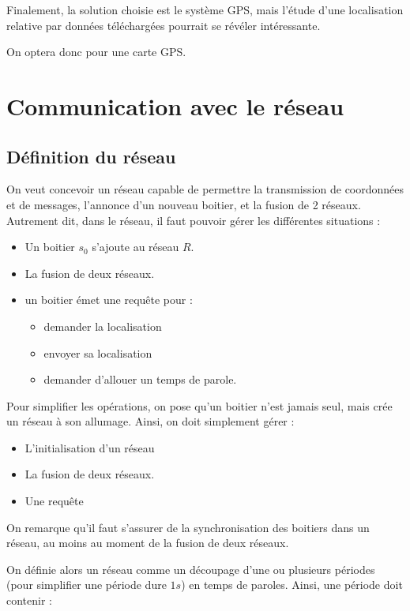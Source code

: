 \documentclass{article}
\begin{document}
Finalement, la solution choisie est le système GPS, mais l'étude d'une localisation relative par données téléchargées pourrait se révéler intéressante.

On optera donc pour une carte GPS.


\section{Communication avec le réseau}

\subsection{Définition du réseau}

On veut concevoir un réseau capable de permettre la transmission de coordonnées et de messages, l'annonce d'un nouveau boitier, et la fusion de 2 réseaux. Autrement dit, dans le réseau, il faut pouvoir gérer les différentes situations :

\begin{itemize}
    \item Un boitier $s_0$ s'ajoute au réseau $R$.
    \item La fusion de deux réseaux.
    \item un boitier émet une requête pour :
    \begin{itemize}
        \item demander la localisation
        \item envoyer sa localisation
        \item demander d'allouer un temps de parole.
    \end{itemize}
\end{itemize}


Pour simplifier les opérations, on pose qu'un boitier n'est jamais seul, mais crée un réseau à son allumage.
Ainsi, on doit simplement gérer :

\begin{itemize}
    \item L'initialisation d'un réseau
    \item La fusion de deux réseaux.
    \item Une requête
\end{itemize}

On remarque qu'il faut s'assurer de la synchronisation des boitiers dans un réseau, au moins au moment de la fusion de deux réseaux.

On définie alors un réseau comme un découpage d'une ou plusieurs périodes (pour simplifier une période dure $1s$) en temps de paroles. Ainsi, une période doit contenir :
\end{document}
